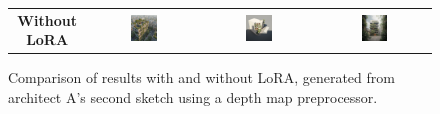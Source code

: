\begin{figure}[H]
{\begin{tabular}{c c c c}
    \textbf{Without LoRA} &
    \includegraphics[width=0.25\textwidth]{Images/Results/Architect-A_unstructured-phase/generated_images/2/Zonder_lora_00015_.png} &
    \includegraphics[width=0.25\textwidth]{Images/Results/Architect-A_unstructured-phase/generated_images/2/Zonder_lora_00016_.png} & \includegraphics[width=0.25\textwidth]{Images/Results/Architect-A_unstructured-phase/generated_images/2/Zonder_lora_00017_.png} \\
  \end{tabular}
  }
  \caption{Comparison of results with and without LoRA, generated from architect A's second sketch using a depth map preprocessor.}
  \label{fig:lora-comparison-2wide}
\end{figure}
